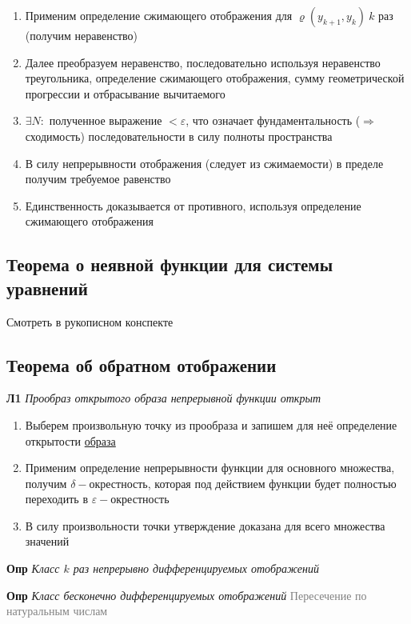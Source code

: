 \begin{enumerate}
    \item Применим определение сжимающего отображения для $\varrho(y_{k+1},y_k)~k$ раз (получим неравенство)
    \item Далее преобразуем неравенство, последовательно используя неравенство треугольника, определение сжимающего
    отображения, сумму геометрической прогрессии и отбрасывание вычитаемого
    \item $\exists N:$ полученное выражение $< \varepsilon $, что означает фундаментальность ($\Rightarrow$
    сходимость) последовательности в силу полноты пространства
    \item В силу непрерывности отображения (следует из сжимаемости) в пределе получим требуемое равенство
    \item Единственность доказывается от противного, используя определение сжимающего отображения
\end{enumerate}

\subsection{Теорема о неявной функции для системы уравнений}

Смотреть в рукописном конспекте

\subsection{Теорема об обратном отображении}

\textbf{Л1} \textit{Прообраз открытого образа непрерывной функции открыт}

\begin{enumerate}
    \item Выберем произвольную точку из прообраза и запишем для неё определение открытости \underline{образа}
    \item Применим определение непрерывности функции для основного множества, получим $\delta-$окрестность,
    которая под действием функции будет полностью переходить в $\varepsilon-$окрестность
    \item В силу произвольности точки утверждение доказана для всего множества значений
\end{enumerate}

\textbf{Опр} \textit{Класс $k$ раз непрерывно дифференцируемых отображений}

\textbf{Опр} \textit{Класс бесконечно дифференцируемых отображений}
\textcolor{gray}{Пересечение по натуральным числам}

